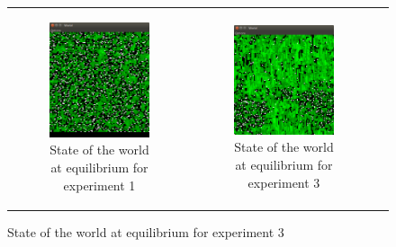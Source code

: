 \documentclass[11pt]{article}
\begin{document}
\begin{figure}
\begin{tabular}{c c c}
{\begin{subfigure}[b]{0.3\textwidth}
        \includegraphics[width=\textwidth]{experiment/1/Space.png}
        \caption{\label{img:world1} State of the world at equilibrium for experiment 1}
    \end{subfigure}} & 
    \begin{subfigure}[b]{0.3\textwidth}
        \includegraphics[width=\textwidth]{experiment/4/Space.png}
        \caption{\label{img:world3} State of the world at equilibrium for experiment 3}
    \end{subfigure}
   

\end{tabular}
\end{figure}
\end{document}
